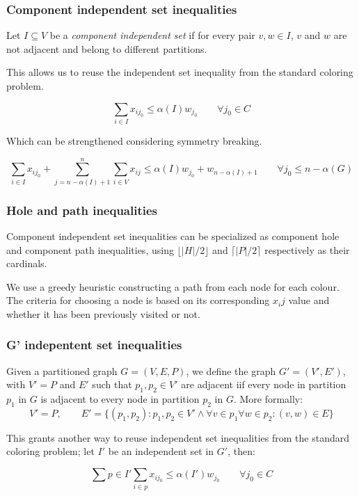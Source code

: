 \documentclass{beamer}
\newcommand{\lpineq}[2]{\[ #1 \qquad #2 \]}
\begin{document}
\begin{frame}
\frametitle{Component independent set inequalities}

Let $I \subseteq V$ be a \textit{component independent set} if for every pair $v,w \in I$, $v$ and $w$ are not adjacent and belong to different partitions.

This allows us to reuse the independent set inequality from the standard coloring problem.

\lpineq{\sum _{i \in I} x_{ij_0} \leq \alpha(I) w_{j_0}}{\forall j_0 \in C}

Which can be strengthened considering symmetry breaking.

\lpineq{\sum _{i \in I} x_{ij_0} + \sum ^n _{j = n - \alpha(I) + 1} \sum _{i \in V} x_{ij} \leq \alpha(I) w_{j_0} + w_{n - \alpha(I) + 1}}
{\forall j_0 \leq n - \alpha(G)}

\end{frame}

\begin{frame}
\frametitle{Hole and path inequalities}

Component independent set inequalities can be specialized as component hole and component path inequalities, using $\lfloor |H|/2 \rfloor$ and $\lceil |P|/2 \rceil$ respectively as their cardinals.

We use a greedy heuristic constructing a path from each node for each colour. The criteria for choosing a node is based on its corresponding $x_ij$ value and whether it has been previously visited or not.

\end{frame}

\begin{frame}
\frametitle{G' indepentent set inequalities}

Given a partitioned graph $G=(V,E,P)$, we define the graph $G'=(V',E')$, with $V' = P$ and $E'$ such that $p_1,p_2 \in V'$ are adjacent iif every node in partition $p_1$ in $G$ is adjacent to every node in partition $p_2$ in $G$. More formally:
\[
V' = P, \qquad E' = \{(p_1,p_2) : p_1,p_2 \in V' \wedge \forall v \in p_1 \forall w \in p_2 : (v,w) \in E \}
\]

This grants another way to reuse independent set inequalities from the standard coloring problem; let $I'$ be an independent set in $G'$, then:

\lpineq{\sum{p \in I'} \sum_{i \in p} x_{ij_0} \leq \alpha(I') w_{j_0}}{\forall j_0 \in C}

\end{frame}
\end{document}
